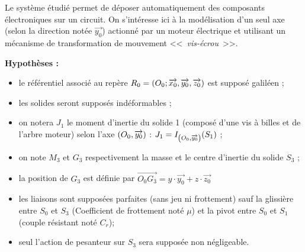 \documentclass[10pt,fleqn]{article} %
\begin{document}
\def\pathfig{images}

\vspace{4.5cm}
\pagestyle{fancy}
\thispagestyle{plain}

\def\columnseprulecolor{\color{ocre}}
\setlength{\columnseprule}{0.4pt} 

\def\pathfig{images}

\ifprof
\else
\begin{multicols}{2}
\fi


Le système étudié permet de déposer automatiquement des composants électroniques sur un circuit.
On s'intéresse ici à la modélisation d'un seul axe (selon la direction notée $\overrightarrow{y_0}$) actionné par un moteur électrique et utilisant un mécanisme de transformation de mouvement <<~\textit{vis-écrou}~>>.

\textbf{Hypothèses :}
\begin{itemize}
\item le référentiel associé au repère $R_0=\left(O_0;\overrightarrow{x_0},\overrightarrow{y_0},\overrightarrow{z_0} \right)$ est supposé galiléen ;
\item les solides seront supposés indéformables ; 
\item on notera $J_1$ le moment d'inertie du solide 1 (composé d'une vis à billes et de l'arbre moteur) selon l'axe $\left(O_0,\overrightarrow{{y_0}}\right)$ : $J_1=I_{\left(O_0,\overrightarrow{{y_0}}\right)}(S_1)$ ;
\item on note $M_3$ et $G_3$ respectivement la masse et le centre d'inertie du solide $S_3$ ;
\item la position de $G_3$ est définie par $\overrightarrow{O_0G_3}=y\cdot \overrightarrow{y_0}+z\cdot \overrightarrow{z_0}$
\item les liaisons sont supposées parfaites (sans jeu ni frottement) sauf la glissière entre $S_0$ et $S_3$ (Coefficient de frottement noté $\mu$) et la pivot entre $S_0$ et $S_1$ (couple résistant noté $C_r$);
\item seul l'action de pesanteur sur $S_3$ sera supposée non négligeable.
\end{itemize}

\begin{center}


\end{center}
\end{multicols}
\end{document}
